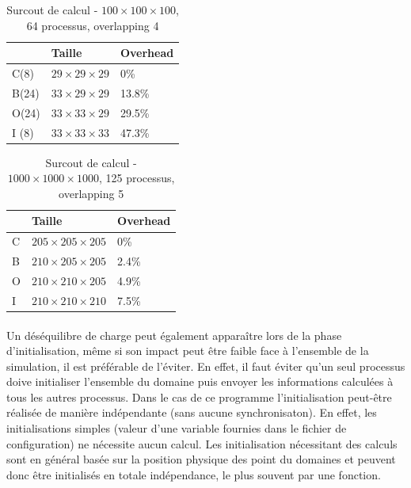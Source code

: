 \begin{table}[h!]
  \begin{center}
    \begin{tabular}{|P{2cm}|P{3.5cm}|P{3.5cm}|}
      \hline
      & Taille & Overhead \\ \hline
      C(8) & $29\times29\times29$ & 0\%  \\ \hline
      B(24) & $33\times29\times29$ & 13.8\%  \\ \hline
      O(24) & $33\times33\times29$ & 29.5\%  \\ \hline
      I (8)& $33\times33\times33$ & 47.3\%  \\ \hline      
    \end{tabular}
    \caption{\label{arr:overlap_res}Surcout de calcul - $100\times100\times100$, 64 processus, overlapping 4}
  \end{center}
\end{table}


\begin{table}[h!]
  \begin{center}
    \begin{tabular}{|P{2cm}|P{3.5cm}|P{3.5cm}|}
      \hline
      & Taille & Overhead \\ \hline
      C & $205\times205\times205$ & 0\%    \\ \hline
      B & $210\times205\times205$ & 2.4\%  \\ \hline
      O & $210\times210\times205$ & 4.9\%  \\ \hline
      I & $210\times210\times210$ & 7.5\%  \\ \hline      
    \end{tabular}
    \caption{\label{arr:overlap_res_big}Surcout de calcul - $1000\times1000\times1000$, 125 processus, overlapping 5}
  \end{center}
\end{table}


\paragraph{}Un déséquilibre de charge peut également apparaître lors de la phase d'initialisation, même si son impact peut être faible face à l'ensemble de la simulation, il est préférable de l'éviter. En effet, il faut éviter qu'un seul processus doive initialiser l'ensemble du domaine puis envoyer les informations calculées à tous les autres processus. Dans le cas de ce programme l'initialisation peut-être réalisée de manière indépendante (sans aucune synchronisaton). En effet, les initialisations simples (valeur d'une variable fournies dans le fichier de configuration) ne nécessite aucun calcul. Les initialisation nécessitant des calculs sont en général basée sur la position physique des point du domaines et peuvent donc être initialisés en totale indépendance, le plus souvent par une fonction.


